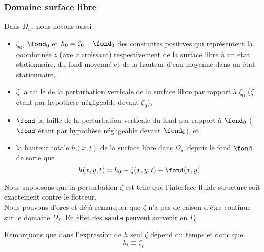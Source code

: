 \subsubsection{Domaine surface libre}
Dans $\Omega_w$, nous notons aussi
\begin{itemize}[label=$\mybullet$]
	\item $\zeta_0$, $\fond_0$ et $h_0 = \zeta_0 - \fond_0$ des constantes positives qui représentent la coordonnée $z$ (axe $z$ croissant) respectivement de la surface libre à un état stationnaire, du fond moyenné et de la hauteur d'eau moyenne dans un état stationnaire,
	\item $\zeta$ la taille de la perturbation verticale de la surface libre par rapport à $\zeta_0$ ($\zeta$ étant par hypothèse négligeable devant $\zeta_0$), 
	\item $\fond$ la taille de la perturbation verticale du fond par rapport à $\fond_0$ ($\fond$ étant par hypothèse négligeable devant $\fond_0$), et
	\item la hauteur totale $h(x, t)$ de la surface libre dans $\Omega_w$ depuis le fond $\fond$, de sorte que
	\begin{equation}
	h(x, y, t) = h_0 + \zeta(x, y, t) - \fond (x, y) \label{eq:deep}
	\end{equation}
\end{itemize}
\noindent Nous supposons que la perturbation $\zeta$ est telle que l'interface fluide-structure soit exactement contre le flotteur.\\
Nous pouvons d'ores et déjà remarquer que $\zeta$ n'a pas de raison d'être continue sur le domaine $\Omega_f$. En effet des \textbf{sauts} peuvent survenir en $\Gamma_0$.\\

\begin{refe}
Remarquons que dans l'expression de $h$ seul $\zeta$ dépend du temps et donc que 
\begin{equation}
	h_t  \equiv \zeta_t \label{eq:der_t_h}
\end{equation}
\end{refe}

